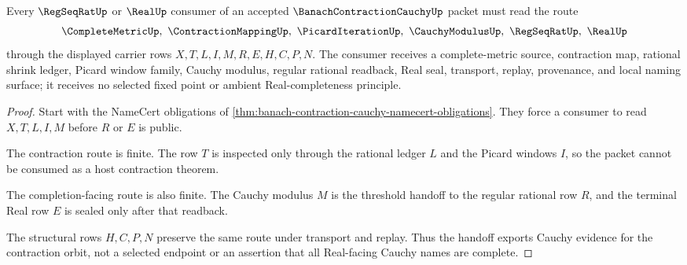 \begin{theorem}
\label{thm:banach-contraction-cauchy-regular-handoff}
Every $\RegSeqRatUp$ or $\RealUp$ consumer of an accepted $\BanachContractionCauchyUp$ packet must read the route
$$
\CompleteMetricUp,\ \ContractionMappingUp,\ \PicardIterationUp,\ \CauchyModulusUp,\ \RegSeqRatUp,\ \RealUp
$$
through the displayed carrier rows $X,T,L,I,M,R,E,H,C,P,N$. The consumer receives a complete-metric source, contraction map, rational shrink ledger, Picard window family, Cauchy modulus, regular rational readback, Real seal, transport, replay, provenance, and local naming surface; it receives no selected fixed point or ambient Real-completeness principle.
\end{theorem}
\begin{proof}
Start with the NameCert obligations of \autoref{thm:banach-contraction-cauchy-namecert-obligations}. They force a consumer to read $X,T,L,I,M$ before $R$ or $E$ is public.

The contraction route is finite. The row $T$ is inspected only through the rational ledger $L$ and the Picard windows $I$, so the packet cannot be consumed as a host contraction theorem.

The completion-facing route is also finite. The Cauchy modulus $M$ is the threshold handoff to the regular rational row $R$, and the terminal Real row $E$ is sealed only after that readback.

The structural rows $H,C,P,N$ preserve the same route under transport and replay. Thus the handoff exports Cauchy evidence for the contraction orbit, not a selected endpoint or an assertion that all Real-facing Cauchy names are complete.
\end{proof}



